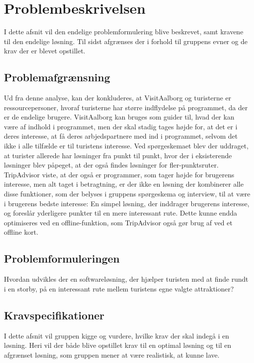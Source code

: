 \chapter{Problembeskrivelsen}

I dette afsnit vil den endelige problemformulering blive beskrevet, samt kravene til den endelige løsning. Til sidst afgrænses der i forhold til gruppens evner og de krav der er blevet opstillet. 

\section{Problemafgrænsning}
Ud fra denne analyse, kan der konkluderes, at VisitAalborg og turisterne er ressourcepersoner, hvoraf turisterne har større indflydelse på programmet, da der er de endelige brugere. VisitAalborg kan bruges som guider til, hvad der kan være af indhold i programmet, men der skal stadig tages højde for, at det er i deres interesse, at få deres arbjedspartnere med ind i programmet, selvom det ikke i alle tilfælde er til turistens interesse.
Ved spørgeskemaet blev der uddraget, at turister allerede har løsninger fra punkt til punkt, hvor der i eksisterende løsninger blev påpeget, at der også findes løsninger for fler-punktsruter. TripAdvisor viste, at der også er programmer, som tager højde for brugerens interesse, men alt taget i betragtning, er der ikke en løsning der kombinerer alle disse funktioner, som der belyses i gruppens spørgeskema og interview, til at være i brugerens bedste interesse: En simpel løsning, der inddrager brugerens interesse, og foreslår yderligere punkter til en mere interessant rute. Dette kunne endda optimiseres ved en offline-funktion, som TripAdvisor også gør brug af ved et offline kort.

\section{Problemformuleringen}
Hvordan udvikles der en softwareløsning, der hjælper turisten med at finde rundt i en storby, på en interessant rute mellem turistens egne valgte attraktioner?

\section{Kravspecifikationer}
I dette afsnit vil gruppen kigge og vurdere, hvilke krav der skal indegå i en løsning. Heri vil der både blive opstillet krav til en optimal løsning og til en afgrænset løsning, som gruppen mener at være realistisk, at kunne lave.

